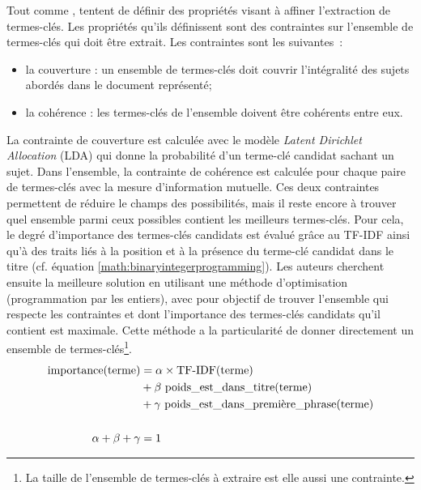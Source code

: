           Tout comme \citet{tomokiyo2003languagemodel},
          \citet{ding2011binaryintegerprogramming} tentent de définir des
          propriétés visant à affiner l'extraction de termes-clés. Les
          propriétés qu'ils définissent sont des contraintes sur l'ensemble de
          termes-clés qui doit être extrait. Les contraintes sont les
          suivantes~:
          \begin{itemize}
            \item{la couverture : un ensemble de termes-clés doit couvrir
                  l'intégralité des sujets abordés dans le document
                  représenté;}
            \item{la cohérence : les termes-clés de l'ensemble doivent être
                  cohérents entre eux.}
          \end{itemize}
          La contrainte de couverture est calculée avec le modèle \textit{Latent
          Dirichlet Allocation} (LDA) \citep{blei2003lda} qui donne la
          probabilité d'un terme-clé candidat sachant un sujet. Dans l'ensemble,
          la contrainte de cohérence est calculée pour chaque paire de
          termes-clés avec la mesure d'information mutuelle. Ces deux
          contraintes permettent de réduire le champs des possibilités, mais il
          reste encore à trouver quel ensemble parmi ceux possibles contient les
          meilleurs termes-clés. Pour cela, le degré d'importance des
          termes-clés candidats est évalué grâce au TF-IDF ainsi qu'à des traits
          liés à la position et à la présence du terme-clé candidat dans le
          titre (cf. équation \ref{math:binaryintegerprogramming}). Les auteurs
          cherchent ensuite la meilleure solution en utilisant une méthode
          d'optimisation (programmation par les entiers), avec pour objectif de
          trouver l'ensemble qui respecte les contraintes et dont l'importance
          des termes-clés candidats qu'il contient est maximale. Cette méthode a
          la particularité de donner directement un ensemble de
          termes-clés\footnote{La taille de l'ensemble de termes-clés à extraire
          est elle aussi une contrainte.}.
          \begin{align}
            \text{importance}(\text{terme}) &= \alpha \times \text{TF-IDF}(\text{terme}) \notag\\
                              &+ \beta\ \text{poids\_est\_dans\_titre}(\text{terme}) \notag\\
                              &+ \gamma\ \text{poids\_est\_dans\_première\_phrase}(\text{terme}) \label{math:binaryintegerprogramming}\\
            \notag\\
            \alpha + \beta + \gamma &= 1 \notag
          \end{align}

